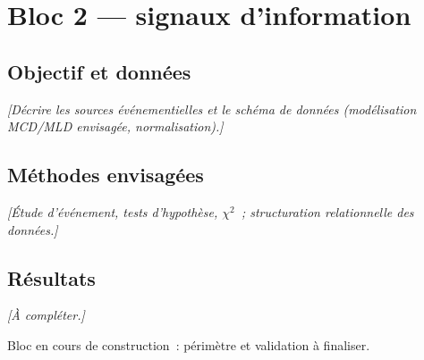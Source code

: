 \chapter{Bloc 2 --- signaux d'information}
\label{chap:bloc2}


\section{Objectif et données}
\emph{[Décrire les sources événementielles et le schéma de données
(modélisation MCD/MLD envisagée, normalisation).]}

\section{Méthodes envisagées}
\emph{[Étude d'événement, tests d'hypothèse, $\chi^2$~; structuration
relationnelle des données.]}

\section{Résultats}
\emph{[À compléter.]}

\begin{limites}
Bloc en cours de construction~: périmètre et validation à finaliser.
\end{limites}
